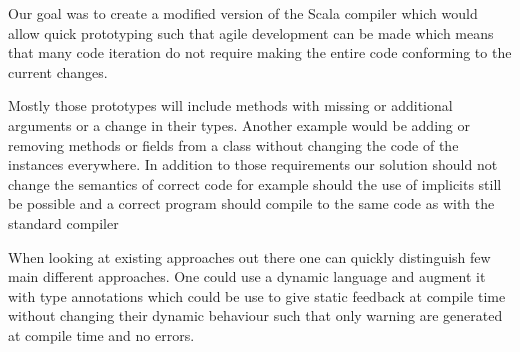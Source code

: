 
Our goal was to create a modified version of the Scala compiler which would allow quick prototyping such that agile development can be made which means that many code iteration do not require making the entire code conforming to the current changes.

Mostly those prototypes will include methods with missing or additional arguments or a change in their types. Another example would be adding or removing methods or fields from a class without changing the code of the instances everywhere.
In addition to those requirements our solution should not change the semantics of correct code for example should the use of implicits still be possible and a correct program should compile to the same code as with the standard compiler

When looking at existing approaches out there one can quickly distinguish few main different approaches. One could use a dynamic language and augment it with type annotations which could be use to give static feedback at compile time without changing their dynamic behaviour such that only warning are generated at compile time and no errors.

